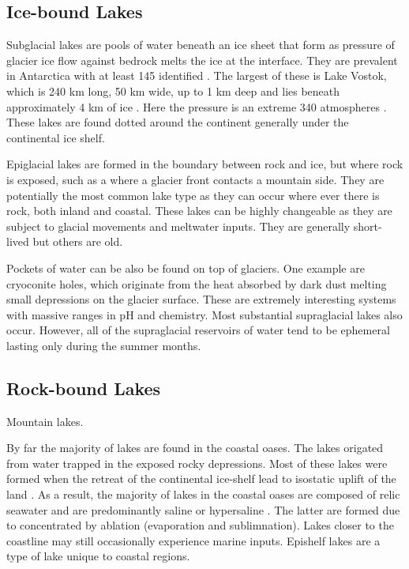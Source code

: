 \subsection{Ice-bound Lakes}
Subglacial lakes are pools of water beneath an ice sheet that form as pressure of glacier ice flow against bedrock melts the ice at the interface. 
They are prevalent in Antarctica with at least 145 identified \cite{Siegert2005}.
The largest of these is Lake Vostok, which is 240 km long, 50 km wide, up to 1 km deep and lies beneath approximately 4 km of ice \cite{Siegert2001}.
Here the pressure is an extreme 340 atmospheres \cite{Siegert2001}.
These lakes are found dotted around the continent generally under the continental ice shelf.%

Epiglacial lakes are formed in the boundary between rock and ice, but where rock is exposed, such as a where a glacier front contacts a mountain side.
They are potentially the most common lake type as they can occur where ever there is rock, both inland and coastal\cite{Hodgeson2012}. %
These lakes can be highly changeable as they are subject to glacial movements and meltwater inputs.
They are generally short-lived but others are old.

Pockets of water can be also be found on top of glaciers. 
One example are cryoconite holes, which originate from the heat absorbed by dark dust melting small depressions on the glacier surface. 
These are extremely interesting systems with massive ranges in pH and chemistry.
Most substantial supraglacial lakes also occur.
However, all of the supraglacial reservoirs of water tend to be ephemeral lasting only during the summer months.

\subsection{Rock-bound Lakes}
Mountain lakes. %

By far the majority of lakes are found in the coastal oases. 
The lakes origated from water trapped in the exposed rocky depressions.
Most of these lakes were formed when the retreat of the continental ice-shelf lead to isostatic uplift of the land \cite{Burton1981}. %
As a result, the majority of lakes in the coastal oases are composed of relic seawater and are predominantly saline or hypersaline \cite{Burke1988}.
The latter are formed due to concentrated by ablation (evaporation and sublimnation). %
Lakes closer to the coastline may still occasionally experience marine inputs. %
Epishelf lakes are a type of lake unique to coastal regions.

